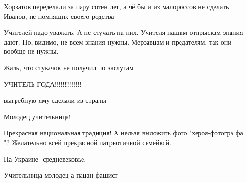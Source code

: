 \begin{itemize}

Хорватов переделали за пару сотен лет, а чё бы и из малороссов не сделать
Иванов, не помнящих своего родства

Учителей надо уважать.
А не стучать на них.
Учителя нашим отпрыскам знания дают.
Но, видимо, не всем знания нужны.
Мерзавцам и предателям, так они вообще не нужны.

Жаль, что стукачок не получил по заслугам

УЧИТЕЛЬ ГОДА!!!!!!!!!!!!!!

выгребную яму сделали из страны

Молодец учительница!

Прекрасная национальная традиция! А нельзя выложить фото "хероя-фотогра фа "? Желательно всей прекрасной патриотичной семейкой.

На Украине- средневековье.

Учительница молодец а пацан фашист


\end{itemize} %

